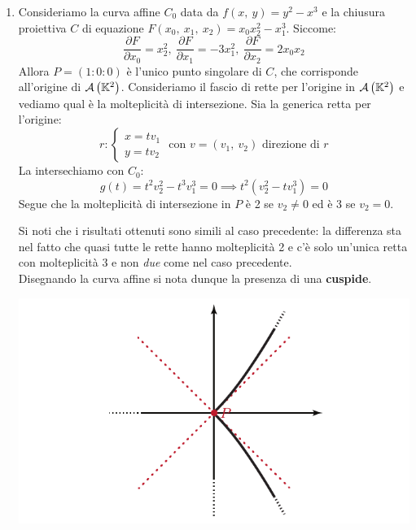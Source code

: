 \begin{examples}
\begin{enumerate}
		\item	Consideriamo la curva affine $C_0$ data da $f\left(x,\ y\right)=y^2-x^3$ e la chiusura proiettiva $C$ di equazione $F(x_0,\ x_1,\ x_2)=x_0x_2^2-x_1^3$. Siccome:
		\begin{equation*}
			\frac{\partial{F}}{\partial{x_0}} =x_2^2,\ \frac{\partial{F}}{\partial{x_1}}= -3x_1^2,\ \frac{\partial{F}}{\partial{x_2}}= 2x_0x_2
		\end{equation*} 
		Allora $P=(1\colon 0\colon 0)$ è l'unico punto singolare di $C$, che corrisponde all'origine di ${\mathcal{A}\left(\mathbb{K}^2\right)}$. Consideriamo il fascio di rette per l'origine in ${\mathcal{A}\left(\mathbb{K}^2\right)}$ e vediamo qual è la molteplicità di intersezione. Sia la generica retta per l'origine:
		\begin{equation*}
			r\colon \begin{cases}
				x=tv_1 \\
				y=tv_2
			\end{cases}\text{ con } v=(v_1,\ v_2)\text{ direzione di }r
		\end{equation*}
		La intersechiamo con $C_0$:
		\begin{equation*}
			g(t)=t^2v_2^2 -t^3v_1^3=0 \implies t^2(v_2^2 -tv_1^3)=0
		\end{equation*}
		Segue che la molteplicità di intersezione in $P$ è 2 se $v_2\neq 0$ ed è 3 se $v_2=0$.
		\begin{minipage}{0.65\textwidth}
			Si noti che i risultati ottenuti sono simili al caso precedente: la differenza sta nel fatto che quasi tutte le rette hanno molteplicità 2 e c'è solo un'unica retta con molteplicità 3 e non \textit{due} come nel caso precedente.\\
			Disegnando la curva affine si nota dunque la presenza di una \textbf{cuspide}.
		\end{minipage}
		\hspace{-12mm}
		\begin{minipage}{0.34\textwidth}
			\includegraphics[trim=0cm 0cm 0cm 0cm,clip,scale=0.50]{images/planecurve3.pdf}
		\end{minipage}
	\end{enumerate}
\end{examples}
